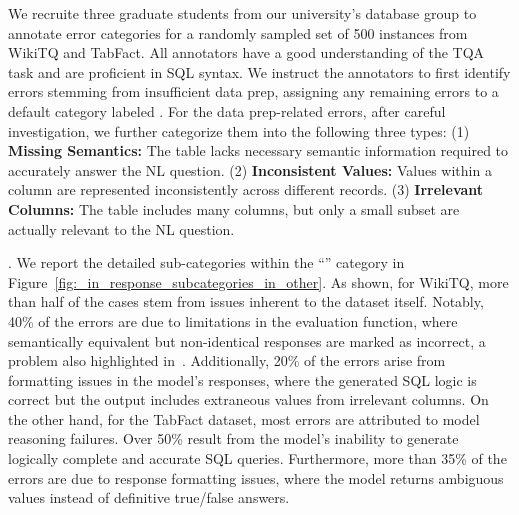 We recruite three graduate students from our university's database group to annotate error categories for a randomly sampled set of 500 instances from WikiTQ and TabFact. All annotators have a good understanding of the TQA task and are proficient in SQL syntax.
We instruct the annotators to first identify errors stemming from insufficient data prep, assigning any remaining errors to a default category labeled . For the data prep-related errors, after careful investigation, we further categorize them into the following three types:
(1) \textbf{Missing Semantics:} The table lacks necessary semantic information required to accurately answer the NL question. 
(2) \textbf{Inconsistent Values:} Values within a column are represented inconsistently across different records. 
(3) \textbf{Irrelevant Columns:} The table includes many columns, but only a small subset are actually relevant to the NL question. 



. 
We report the detailed sub-categories within the ``'' category in Figure~\ref{fig:_in_response_subcategories_in_other}. As shown, for WikiTQ, more than half of the cases stem from issues inherent to the dataset itself. Notably, 40\% of the errors are due to limitations in the evaluation function, where semantically equivalent but non-identical responses are marked as incorrect, a problem also highlighted in~\cite{cheng2023binding}. Additionally, 20\% of the errors arise from formatting issues in the model’s responses, where the generated SQL logic is correct but the output includes extraneous values from irrelevant columns.
On the other hand, for the TabFact dataset, most errors are attributed to model reasoning failures. Over 50\% result from the model’s inability to generate logically complete and accurate SQL queries. Furthermore, more than 35\% of the errors are due to response formatting issues, where the model returns ambiguous values instead of definitive true/false answers. 



